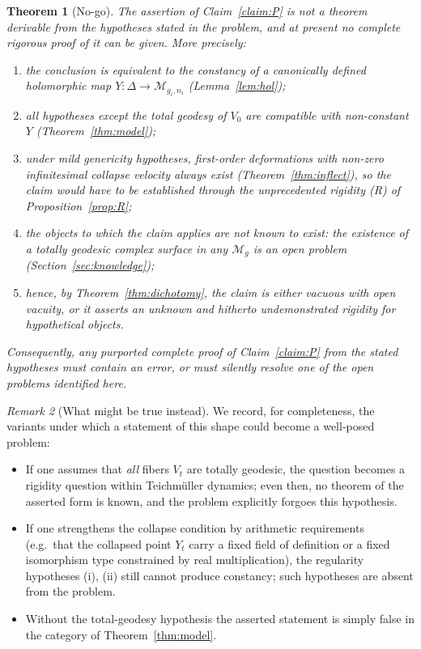 \documentclass[11pt]{amsart}
\newcommand{\M}{\mathcal{M}}
\theoremstyle{plain}
\newtheorem{theorem}{Theorem}[section]
\theoremstyle{definition}
\theoremstyle{remark}
\newtheorem{remark}[theorem]{Remark}
\begin{document}
\begin{theorem}[No-go]\label{thm:nogo}
The assertion of Claim~\textup{\ref{claim:P}} is not a theorem derivable from the
hypotheses stated in the problem, and at present no complete rigorous proof of it
can be given. More precisely:
\begin{enumerate}
\item the conclusion is equivalent to the constancy of a canonically defined
holomorphic map $Y:\Delta\to\M_{g_i,n_i}$ (Lemma~\textup{\ref{lem:hol}});
\item all hypotheses except the total geodesy of $V_0$ are compatible with
non-constant $Y$ (Theorem~\textup{\ref{thm:model}});
\item under mild genericity hypotheses, first-order deformations with non-zero
infinitesimal collapse velocity always exist (Theorem~\textup{\ref{thm:inflect}}),
so the claim would have to be established through the unprecedented rigidity
\textup{(R)} of Proposition~\textup{\ref{prop:R}};
\item the objects to which the claim applies are not known to exist: the existence
of a totally geodesic complex surface in any $\M_g$ is an open problem
(Section~\textup{\ref{sec:knowledge}});
\item hence, by Theorem~\textup{\ref{thm:dichotomy}}, the claim is either vacuous
with open vacuity, or it asserts an unknown and hitherto undemonstrated rigidity for
hypothetical objects.
\end{enumerate}
Consequently, any purported complete proof of Claim~\textup{\ref{claim:P}} from the
stated hypotheses must contain an error, or must silently resolve one of the open
problems identified here.
\end{theorem}

\begin{remark}[What might be true instead]
We record, for completeness, the variants under which a statement of this shape could
become a well-posed problem:
\begin{itemize}
\item If one assumes that \emph{all} fibers $V_t$ are totally geodesic, the question
becomes a rigidity question within Teichm\"uller dynamics; even then, no theorem of
the asserted form is known, and the problem explicitly forgoes this hypothesis.
\item If one strengthens the collapse condition by arithmetic requirements (e.g.\
that the collapsed point $Y_t$ carry a fixed field of definition or a fixed
isomorphism type constrained by real multiplication), the regularity hypotheses (i),
(ii) still cannot produce constancy; such hypotheses are absent from the problem.
\item Without the total-geodesy hypothesis the asserted statement is simply false
in the category of Theorem~\ref{thm:model}.
\end{itemize}
\end{remark}
\end{document}
